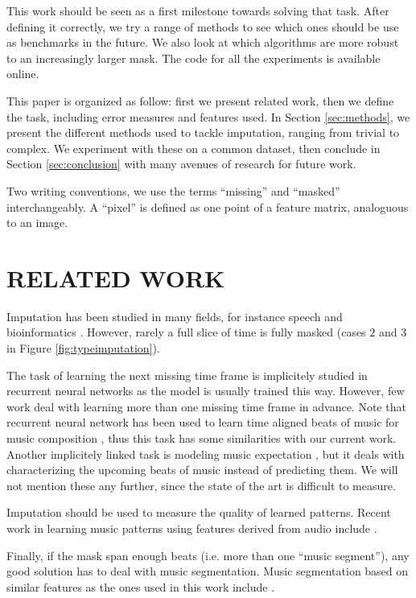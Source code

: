 \documentclass{article}
\begin{document}
This work should be seen as a first milestone towards solving that task.
After defining it correctly, we try a range of methods to see which ones should
be use as benchmarks in the future. We also look at which algorithms are more robust
to an increasingly larger mask. The code for all the experiments is available
online.

This paper is organized as follow: first we present related work, then we define the
task, including error measures and features used. In Section \ref{sec:methods},
we present the different methods used to tackle imputation, ranging from trivial
to complex. We experiment with these on a common dataset, then conclude in
Section \ref{sec:conclusion} with many avenues of research for future work.

Two writing conventions, we use the terms ``missing'' and ``masked'' interchangeably.
A ``pixel'' is defined as one point of a feature matrix, analoguous to an image.

\section{RELATED WORK}
\label{sec:relatedwork}
Imputation has been studied in many fields, for instance speech 
\cite{Morris1998,Smaragdis2009} and bioinformatics \cite{Oba2003}.
However, rarely a full slice of time is fully masked (cases $2$ and $3$
in Figure \ref{fig:typeimputation}).

The task of learning the next missing time frame is implicitely studied in recurrent
neural networks as the model is usually trained this way. However, few work deal
with learning more than one missing time frame in advance. Note that recurrent neural
network has been used to learn time aligned beats of music for music composition
\cite{Todd1989,Mozer1994a,Eck2002d}, thus this task has some similarities with our current
work. Another implicitely linked task is modeling music expectation \cite{Hazan2010}, but it deals
with characterizing the upcoming beats of music instead of predicting them.
We will not mention these any further, since the state of the art is difficult to measure.

Imputation should be used to measure the quality of learned patterns. Recent work in 
learning music patterns using features derived from audio include 
\cite{Anglade2009,Bertin-Mahieux2010a,Casey2007,Weiss2010}.

Finally, if the mask span enough beats (i.e. more than one ``music segment''), any good
solution has to deal with music segmentation. Music segmentation based on similar features as
the ones used in this work include \cite{Weiss2010,Levy2008,Mauch2009}.
\end{document}

